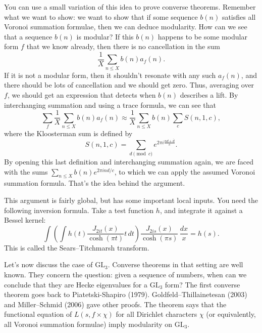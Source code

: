 \documentclass[reqno]{amsart} 
\numberwithin{theorem}{section}
\numberwithin{equation}{section}
\begin{document}
You can use a small variation of this idea to prove converse theorems.  Remember what we want to show: we want to show that if some sequence $b(n)$ satisfies all Voronoi summation formulae, then we can deduce modularity.  How can we see that a sequence $b(n)$ is modular?  If this $b(n)$ happens to be some modular form $f$ that we know already, then there is no cancellation in the sum
\begin{equation*}
  \frac{1}{X} \sum_{n \leq X} b(n) a_f(n).
\end{equation*}
If it is not a modular form, then it shouldn't resonate with any such $a_f(n)$, and there should be lots of cancellation and we should get zero.  Thus, averaging over $f$, we should get an expression that detects when $b(n)$ describes a lift.  By interchanging summation and using a trace formula, we can see that
\begin{equation*}
  \sum_f \frac{1}{X} \sum_{n \leq X} b(n) a_f(n)
  \approx
  \frac{1}{X}
  \sum_{n \leq X} b(n)
  \sum_c S(n, 1, c),
\end{equation*}
where the Kloosterman sum is defined by
\begin{equation}\label{eq:cnrbw6p2zj}
  S(n, 1, c) = \sum_{d \pmod{c}} e^{2 \pi i \frac{n d + \bar{d}}{c}}.
\end{equation}
By opening this last definition and interchanging summation again, we are faced with the sums $\sum_{n \leq X} b(n) e^{2 \pi i n d/c}$, to which we can apply the assumed Voronoi summation formula.  That's the idea behind the argument.

This argument is fairly global, but has some important local inputs.  You need the following inversion formula.  Take a test function $h$, and integrate it against a Bessel kernel:
\begin{equation*}
  \int
  \left( \int h(t) \frac{J_{2 i t}(x)}{ \cosh(\pi t)}
    t \, d t \right)
  \frac{J_{2 i s}(x)}{\cosh(\pi s)}
  \, \frac{d x}{x}
  = h(s).
\end{equation*}
This is called the Sears--Titchmarsh transform.

Let's now discuss the case of $\mathrm{GL}_3$.  Converse theorems in that setting are well known.  They concern the question: given a sequence of numbers, when can we conclude that they are Hecke eigenvalues for a $\mathrm{GL}_3$ form?  The first converse theorem goes back to Piatetski-Shapiro (1979).  Goldfeld--Thillainetesan (2003) and Miller--Schmid (2006) gave other proofs.  The theorem says that the functional equation of $L(s, f \times \chi)$ for all Dirichlet characters $\chi$ (or equivalently, all Voronoi summation formulae) imply modularity on $\mathrm{GL}_3$.
\end{document}
